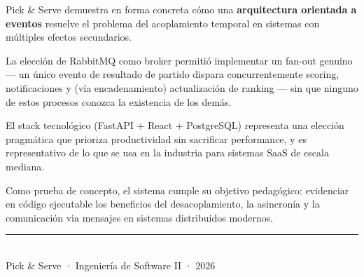 \documentclass[12pt,a4paper]{article}
\begin{document}
Pick \& Serve demuestra en forma concreta cómo una \textbf{arquitectura orientada a eventos}
resuelve el problema del acoplamiento temporal en sistemas con múltiples efectos secundarios.

La elección de RabbitMQ como broker permitió implementar un fan-out genuino — un único
evento de resultado de partido dispara concurrentemente scoring, notificaciones y (vía
encadenamiento) actualización de ranking — sin que ninguno de estos procesos conozca
la existencia de los demás.

El stack tecnológico (FastAPI + React + PostgreSQL) representa una elección pragmática
que prioriza productividad sin sacrificar performance, y es representativo de lo que se
usa en la industria para sistemas SaaS de escala mediana.

Como prueba de concepto, el sistema cumple su objetivo pedagógico: evidenciar en código
ejecutable los beneficios del desacoplamiento, la asincronía y la comunicación via
mensajes en sistemas distribuidos modernos.

\vspace{1cm}
\begin{center}
{\color{accent}\rule{0.6\linewidth}{1.5pt}}\\[0.3cm]
{\small\color{codegray} Pick \& Serve · Ingeniería de Software II · 2026}
\end{center}
\end{document}
